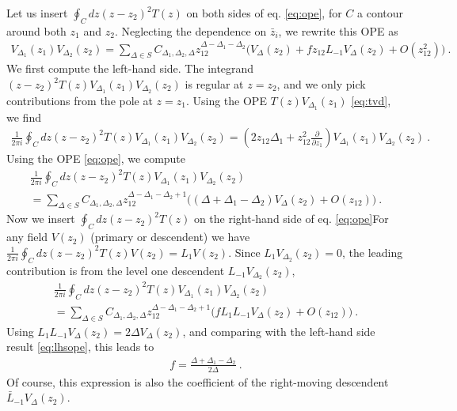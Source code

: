 \documentclass[12pt, a4paper]{article}
\theoremstyle{break}
\begin{document}
Let us insert $\oint_C dz(z-z_2)^2 T(z)$ on both sides of eq. \eqref{eq:ope}, for $C$ a contour around both $z_1$ and $z_2$. Neglecting the dependence on $\bar z_i$, we rewrite this OPE as 
\begin{align}
 V_{\Delta_1}(z_1) V_{\Delta_2}(z_2) 
 = \sum_{\Delta\in S} C_{\Delta_1,\Delta_2,\Delta} z_{12}^{\Delta-\Delta_1-\Delta_2}
 \Big(V_{\Delta}(z_2) + f z_{12} L_{-1}V_{\Delta}(z_2) + O(z_{12}^2) \Big)\ .
\end{align}
We first compute the left-hand side. The integrand $(z-z_2)^2 T(z) V_{\Delta_1}(z_1)V_{\Delta_2}(z_2)$ is regular at $z=z_2$, and we only pick contributions from the pole at $z=z_1$. Using the OPE $T(z)V_{\Delta_1}(z_1)$ \eqref{eq:tvd}, we find 
\begin{align}
 \frac{1}{2\pi i}\oint_C dz(z-z_2)^2 T(z)V_{\Delta_1}(z_1)V_{\Delta_2}(z_2) = \left(2z_{12}\Delta_1+z_{12}^2\frac{\partial}{\partial z_1}\right) V_{\Delta_1}(z_1) V_{\Delta_2}(z_2)\ .
\end{align}
Using the OPE \eqref{eq:ope}, we compute 
\begin{multline}
 \frac{1}{2\pi i}\oint_C dz(z-z_2)^2 T(z)V_{\Delta_1}(z_1)V_{\Delta_2}(z_2)
 \\
 = \sum_{\Delta\in S} C_{\Delta_1,\Delta_2,\Delta} z_{12}^{\Delta-\Delta_1-\Delta_2+1} 
 \Big( (\Delta+\Delta_1-\Delta_2)V_{\Delta}(z_2) + O(z_{12}) \Big)\ .
 \label{eq:lhsope}
\end{multline}
Now we insert $\oint_C dz(z-z_2)^2 T(z)$ on the right-hand side of eq. \eqref{eq:ope}For any field $V(z_2)$ (primary or descendent) we have $\frac{1}{2\pi i}\oint_C dz(z-z_2)^2 T(z)V(z_2) = L_1 V(z_2)$. Since $L_1 V_{\Delta_2}(z_2)=0$, the leading contribution is from the level one descendent $L_{-1} V_{\Delta_2}(z_2)$,
\begin{multline}
 \frac{1}{2\pi i}\oint_C dz(z-z_2)^2 T(z)V_{\Delta_1}(z_1)V_{\Delta_2}(z_2)
 \\
 = \sum_{\Delta\in S} C_{\Delta_1,\Delta_2,\Delta} z_{12}^{\Delta-\Delta_1-\Delta_2+1} 
 \Big( f L_1L_{-1}V_{\Delta}(z_2) + O(z_{12}) \Big)\ .
\end{multline}
Using $L_1L_{-1}V_{\Delta}(z_2)=2\Delta V_\Delta(z_2)$, and comparing with the left-hand side result \eqref{eq:lhsope}, this leads to 
\begin{align}
 f = \frac{\Delta+\Delta_1-\Delta_2}{2\Delta}\ .
\end{align}
Of course, this expression is also the coefficient of the right-moving descendent $\bar L_{-1} V_\Delta(z_2)$.
\end{document}
